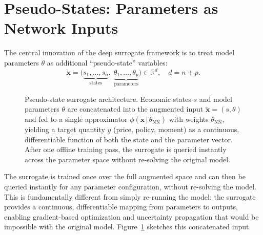 \documentclass[11pt,a4paper]{report}
\newcommand{\x}{\bm{x}}
\newcommand{\R}{\mathbb{R}}
\begin{document}
\section{Pseudo-States: Parameters as Network Inputs}

The central innovation of the deep surrogate framework is to treat model parameters $\theta$ as additional ``pseudo-state'' variables:
\begin{equation}
\tilde{\x} = \bigl(\underbrace{s_1,\dots,s_n}_{\text{states}},\;\underbrace{\theta_1,\dots,\theta_p}_{\text{parameters}}\bigr) \in \R^{d}, \quad d = n + p.
\end{equation}

\begin{figure}[ht]
\centering
{}
\caption{Pseudo-state surrogate architecture. Economic states $s$ and model parameters $\theta$ are concatenated into the augmented input $\tilde{\x} = (s, \theta)$ and fed to a single approximator $\phi(\tilde{\x}\,|\,\theta_\mathrm{NN})$ with weights $\theta_\mathrm{NN}$, yielding a target quantity $y$ (price, policy, moment) as a continuous, differentiable function of both the state and the parameter vector. After one offline training pass, the surrogate is queried instantly across the parameter space without re-solving the original model.}
\label{fig:pseudo_state_surrogate}
\end{figure}

The surrogate is trained once over the full augmented space and can then be queried instantly for any parameter configuration, without re-solving the model.  This is fundamentally different from simply re-running the model: the surrogate provides a continuous, differentiable mapping from parameters to outputs, enabling gradient-based optimization and uncertainty propagation that would be impossible with the original model.  Figure~\ref{fig:pseudo_state_surrogate} sketches this concatenated input.
\end{document}
